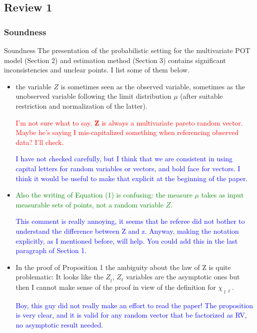 \documentclass[10pt]{article}
\newcommand{\bruno}[1]{\textcolor{blue}{#1}} %
\newcommand{\peter}[1]{\textcolor{red}{#1}}  %
\newcommand{\handled}[1]{\textcolor{green}{#1}} %
\begin{document}
\subsection*{Review 1}
\subsubsection*{Soundness}
Soundness The presentation of the probabilistic setting for the multivariate POT model (Section 2) and estimation method (Section 3) contains significant inconsistencies and unclear points. I list some of them below.
\begin{itemize}
    \item  the variable $Z$ is sometimes seen as the observed variable, sometimes as the unobserved variable following the limit distribution $\mu$ (after suitable restriction and normalization of the latter).
    
    \peter{I'm not sure what to say.  $\bm{Z}$ is always a multivariate pareto random vector.  Maybe he's saying I mis-capitalized something when referencing observed data?  I'll check.}
    
    \bruno{I have not checked carefully, but I think that we are consistent in using capital letters for random variables or vectors, and bold face for vectors. I think it would be useful to make that explicit at the beginning of the paper.}
    
    \item \handled{Also the writing of Equation (1) is confusing: the measure $\mu$ takes as input measurable sets of points, not a random variable $Z$.}
    
    \bruno{This comment is really annoying, it seems that he referee did not bother to understand the difference between Z and z. Anyway, making the notation explicitly, as I mentioned before, will help. You could add this in the last paragraph of Section 1.}
    
    
    
    \item  In the proof of Proposition 1 the ambiguity about the law of Z is quite problematic: It looks like the $Z_{\jmath}$, $Z_{\ell}$ variables are the asymptotic ones but then I cannot make sense of the proof in view of the definition for $\chi_{\jmath\ell}$.
    
    \bruno{Boy, this guy did not really make an effort to read the paper! The proposition is very clear, and it is valid for any random vector that be factorized as RV, no asymptotic result needed.}
    

\end{itemize}
\end{document}
